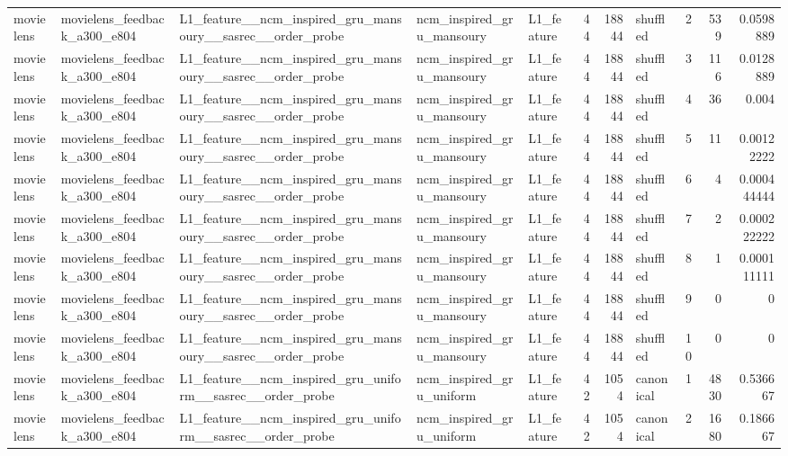 \begin{table}[htbp!]
\begin{tabular}{lllllrrlrrr}
movielens & movielens\_feedback\_a300\_e804 & L1\_feature\_\_ncm\_inspired\_gru\_mansoury\_\_sasrec\_\_order\_probe & ncm\_inspired\_gru\_mansoury & L1\_feature & 44 & 18844 & shuffled & 2 & 539 & 0.0598889 \\
movielens & movielens\_feedback\_a300\_e804 & L1\_feature\_\_ncm\_inspired\_gru\_mansoury\_\_sasrec\_\_order\_probe & ncm\_inspired\_gru\_mansoury & L1\_feature & 44 & 18844 & shuffled & 3 & 116 & 0.0128889 \\
movielens & movielens\_feedback\_a300\_e804 & L1\_feature\_\_ncm\_inspired\_gru\_mansoury\_\_sasrec\_\_order\_probe & ncm\_inspired\_gru\_mansoury & L1\_feature & 44 & 18844 & shuffled & 4 & 36 & 0.004 \\
movielens & movielens\_feedback\_a300\_e804 & L1\_feature\_\_ncm\_inspired\_gru\_mansoury\_\_sasrec\_\_order\_probe & ncm\_inspired\_gru\_mansoury & L1\_feature & 44 & 18844 & shuffled & 5 & 11 & 0.00122222 \\
movielens & movielens\_feedback\_a300\_e804 & L1\_feature\_\_ncm\_inspired\_gru\_mansoury\_\_sasrec\_\_order\_probe & ncm\_inspired\_gru\_mansoury & L1\_feature & 44 & 18844 & shuffled & 6 & 4 & 0.000444444 \\
movielens & movielens\_feedback\_a300\_e804 & L1\_feature\_\_ncm\_inspired\_gru\_mansoury\_\_sasrec\_\_order\_probe & ncm\_inspired\_gru\_mansoury & L1\_feature & 44 & 18844 & shuffled & 7 & 2 & 0.000222222 \\
movielens & movielens\_feedback\_a300\_e804 & L1\_feature\_\_ncm\_inspired\_gru\_mansoury\_\_sasrec\_\_order\_probe & ncm\_inspired\_gru\_mansoury & L1\_feature & 44 & 18844 & shuffled & 8 & 1 & 0.000111111 \\
movielens & movielens\_feedback\_a300\_e804 & L1\_feature\_\_ncm\_inspired\_gru\_mansoury\_\_sasrec\_\_order\_probe & ncm\_inspired\_gru\_mansoury & L1\_feature & 44 & 18844 & shuffled & 9 & 0 & 0 \\
movielens & movielens\_feedback\_a300\_e804 & L1\_feature\_\_ncm\_inspired\_gru\_mansoury\_\_sasrec\_\_order\_probe & ncm\_inspired\_gru\_mansoury & L1\_feature & 44 & 18844 & shuffled & 10 & 0 & 0 \\
movielens & movielens\_feedback\_a300\_e804 & L1\_feature\_\_ncm\_inspired\_gru\_uniform\_\_sasrec\_\_order\_probe & ncm\_inspired\_gru\_uniform & L1\_feature & 42 & 1054 & canonical & 1 & 4830 & 0.536667 \\
movielens & movielens\_feedback\_a300\_e804 & L1\_feature\_\_ncm\_inspired\_gru\_uniform\_\_sasrec\_\_order\_probe & ncm\_inspired\_gru\_uniform & L1\_feature & 42 & 1054 & canonical & 2 & 1680 & 0.186667 \\

\end{tabular}
\end{table}
